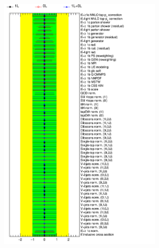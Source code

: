 \begin{figure}[htb!]
\begin{subfigure}{0.5\textwidth}
  \centering
  \includegraphics[width=0.9\textwidth]{figures/VLQ/NuisPar_comp_Backgrounduncertainties_Asimov.png}
  \caption*{}
  \label{}
\end{subfigure}
\begin{subfigure}{0.5\textwidth}
  \centering

\end{subfigure}
\end{figure}
